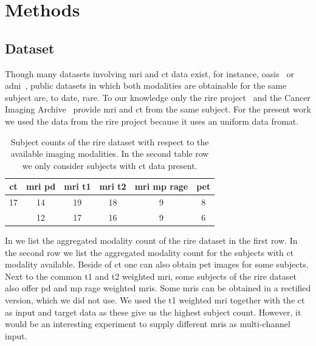 \section{Methods}

\subsection{Dataset}

Though many datasets involving \gls{mri} and \gls{ct} data exist, for instance,
\gls{oasis}~\cite{OASIS} or \gls{adni}~\cite{ADNI}, public datasets in which
both modalities are obtainable for the same subject are, to date, rare. To our
knowledge only the \gls{rire} project~\cite{RIRE} and the Cancer Imaging
Archive~\cite{CIA} provide \gls{mri} and \gls{ct} from the same subject. For
the present work we used the data from the \gls{rire} project because it uses
an uniform data fromat.
\begin{table}[h]
  \centering
  \begin{tabular}{*{6}{c}}
    \toprule
    \acrshort{ct} &
		\acrshort{mri} \acrshort{pd} &
		\acrshort{mri} \acrshort{t1} &
		\acrshort{mri} \acrshort{t2} &
		\acrshort{mri} \acrshort{mp} \acrshort{rage} &
		\acrshort{pet} \\
    \midrule
    \num{17} & \num{14} & \num{19} & \num{18} & \num{9} & \num{8} \\
             & \num{12} & \num{17} & \num{16} & \num{9} & \num{6} \\
    \bottomrule
  \end{tabular}
  \caption{Subject counts of the \gls{rire} dataset with respect to the
    available imaging modalities. In the second table row we only consider
    subjects with \gls{ct} data present.
  }\label{tab:rire}
\end{table}
In  we list the aggregated modality count of the \gls{rire}
dataset in the first row. In the second row we list the aggregated modality
count for the subjects with \gls{ct} modality available. Beside of \gls{ct}
one can also obtain \gls{pet} images for some subjects. Next to the common
\gls{t1} and \gls{t2} weighted \gls{mri}, some subjects of the \gls{rire}
dataset also offer \gls{pd} and \gls{mp} \gls{rage} weighted \gls{mri}s. Some
\gls{mri}s can be obtained in a rectified version, which we did not use. We
used the \gls{t1} weighted \gls{mri} together with the \gls{ct} as input and
target data as these give us the highest subject count. However, it would be
an interesting experiment to supply different \gls{mri}s as multi-channel
input.

